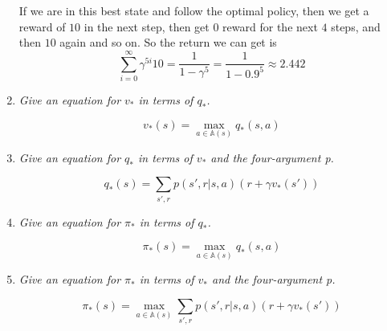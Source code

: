 \documentclass[12pt,a4paper]{article}
\begin{document}
\begin{enumerate}
  If we are in this best state and follow the optimal policy, then we get a reward of $10$
  in the next step, then get $0$ reward for the next $4$ steps, and then $10$ again and so on.
  So the return we can get is
  \[\sum\limits_{i = 0}^{\infty} \gamma^{5i} 10 = \frac{1}{1 - \gamma^5} = \frac{1}{1 - 0.9^5} \approx 2.442\]

\item
  \textit{Give an equation for $v_\ast$ in terms of $q_\ast$.}

  \[v_\ast(s) = \max_{a \in \mathbb{A}(s)} q_\ast(s, a)\]

\item
  \textit{Give an equation for $q_\ast$ in terms of $v_\ast$ and the four-argument p.}

  \[q_\ast(s) = \sum\limits_{s', r}p(s', r | s, a) (r + \gamma v_\ast(s'))\]

\item
  \textit{Give an equation for $\pi_\ast$ in terms of $q_\ast$.}

  \[\pi_\ast(s) = \max_{a \in \mathbb{A}(s)} q_\ast(s, a)\]

\item
  \textit{Give an equation for $\pi_\ast$ in terms of $v_\ast$ and the four-argument p.}

  \[\pi_\ast(s) = \max_{a \in \mathbb{A}(s)} \sum\limits_{s', r}p(s', r | s, a) (r + \gamma v_\ast(s'))\]


\end{enumerate}
\end{document}
